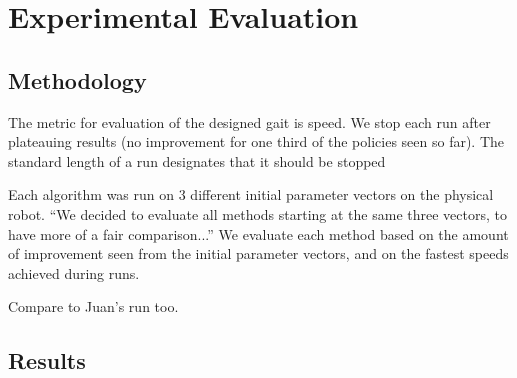 \section{Experimental Evaluation}

\subsection{Methodology}


The metric for evaluation of the designed gait is speed. We stop each 
run after plateauing results (no improvement for one third of the 
policies seen so far). The standard length of a run designates that it
should be stopped

Each algorithm was run on 3 different initial parameter vectors on the
physical robot.  ``We decided to evaluate all methods starting at the
same three vectors, to have more of a fair comparison...'' We evaluate
each method based on the amount of improvement seen from the initial
parameter vectors, and on the fastest speeds achieved during runs.

Compare to Juan's run too.




\subsection{Results}

